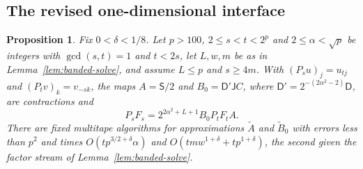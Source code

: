 \documentclass[11pt]{article}
\newtheorem{proposition}{Proposition}
\begin{document}
\subsection{The revised one-dimensional interface}
\begin{proposition}\label{prop:note-one-dimensional}
Fix $0<\delta<1/8$. Let $p>100$, $2\le s<t<2^p$ and $2\le\alpha<\sqrt p$ be
integers with $\gcd(s,t)=1$ and $t<2s$, let $L,w,m$ be as in
Lemma~\ref{lem:banded-solve}, and assume $L\le p$ and $s\ge4m$. With
$(P_su)_j=u_{tj}$ and $(P_tv)_k=v_{-sk}$, the maps $A=\mathsf S/2$ and
$B_0=\mathsf D'\mathsf JC$, where $\mathsf D'=2^{-(2\alpha^2-2)}\mathsf D$,
are contractions and
\[
 P_sF_s=2^{2\alpha^2+L+1}B_0P_tF_tA .
\]
There are fixed multitape algorithms for approximations $\widetilde A$ and
$\widetilde B_0$ with errors less than $p^2$ and times
$O(tp^{3/2+\delta}\alpha)$ and $O(tmw^{1+\delta}+tp^{1+\delta})$, the second
given the factor stream of Lemma~\ref{lem:banded-solve}.
\end{proposition}
\end{document}
